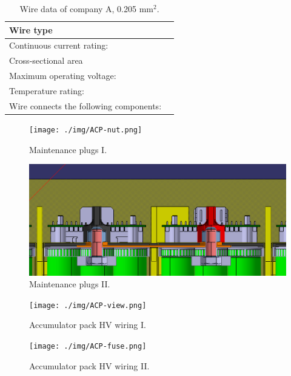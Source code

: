 \begin{table}[htbp]
	\centering
	\caption{Wire data of company A, 0.205 mm$^2$.}
	\begin{tabularx}{\textwidth}{|X|X|}\hline
		Wire type &  \\[\TableSize]\hline
		Continuous current rating: &  \\[\TableSize]\hline
		Cross-sectional area &  \\[\TableSize]\hline
		Maximum operating voltage: &  \\[\TableSize]\hline
		Temperature rating: &  \\[\TableSize]\hline
		Wire connects the following components: &  \\[\TableSize]\hline
	\end{tabularx}%
	\label{tab:acc-wire}%
\end{table}%

\begin{figure}[H]
	\centering
	\texttt{[image: ./img/ACP-nut.png]}
	\caption{Maintenance plugs I.}
	\label{fig:acp-maintance-plug}
\end{figure}

\begin{figure}[H]
	\centering
	\includegraphics[width=\textwidth]{./img/ACP-nut2.png}
	\caption{Maintenance plugs II.}
	\label{fig:acp-maintance-plug2}
\end{figure}

\begin{figure}[H]
	\centering
	\texttt{[image: ./img/ACP-view.png]}
	\caption{Accumulator pack HV wiring I.}
	\label{fig:acp-hv-wiring}
\end{figure}

\begin{figure}[H]
	\centering
	\texttt{[image: ./img/ACP-fuse.png]}
	\caption{Accumulator pack HV wiring II.}
	\label{fig:acp-hv-wiring2}
\end{figure}

